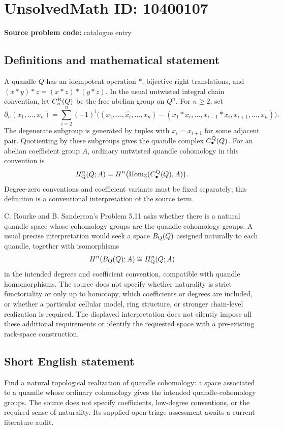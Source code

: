 \documentclass[11pt]{article}
\newcommand{\Z}{\mathbb{Z}}
\begin{document}
\section*{UnsolvedMath ID: 10400107}
\textbf{Source problem code:} catalogue entry
\subsection{Definitions and mathematical statement}
A quandle \(Q\) has an idempotent operation \(*\), bijective right translations, and \((x*y)*z=(x*z)*(y*z)\). In the usual untwisted integral chain convention, let \(C_n^{\rm R}(Q)\) be the free abelian group on \(Q^n\). For \(n\ge2\), set
\[
 \partial_n(x_1,\ldots,x_n)=
 \sum_{i=2}^{n}(-1)^i\bigl(
 (x_1,\ldots,\widehat{x_i},\ldots,x_n)
 -(x_1*x_i,\ldots,x_{i-1}*x_i,x_{i+1},\ldots,x_n)\bigr).
\]
The degenerate subgroup is generated by tuples with \(x_i=x_{i+1}\) for some adjacent pair. Quotienting by these subgroups gives the quandle complex \(C_\bullet^{\rm Q}(Q)\). For an abelian coefficient group \(A\), ordinary untwisted quandle cohomology in this convention is
\[
 H^n_{\rm Q}(Q;A)=H^n\bigl(\operatorname{Hom}_{\Z}(C_\bullet^{\rm Q}(Q),A)\bigr).
\]
Degree-zero conventions and coefficient variants must be fixed separately; this definition is a conventional interpretation of the source term.

C. Rourke and B. Sanderson's Problem 5.11 asks whether there is a natural quandle space whose cohomology groups are the quandle cohomology groups. A usual precise interpretation would seek a space \(B_{\rm Q}(Q)\) assigned naturally to each quandle, together with isomorphisms
\[
 H^n(B_{\rm Q}(Q);A)\cong H^n_{\rm Q}(Q;A)
\]
in the intended degrees and coefficient convention, compatible with quandle homomorphisms. The source does not specify whether naturality is strict functoriality or only up to homotopy, which coefficients or degrees are included, or whether a particular cellular model, ring structure, or stronger chain-level realization is required. The displayed interpretation does not silently impose all these additional requirements or identify the requested space with a pre-existing rack-space construction.
\subsection{Short English statement}
Find a natural topological realization of quandle cohomology: a space associated to a quandle whose ordinary cohomology gives the intended quandle-cohomology groups. The source does not specify coefficients, low-degree conventions, or the required sense of naturality. Its supplied open-triage assessment awaits a current literature audit.
\end{document}
